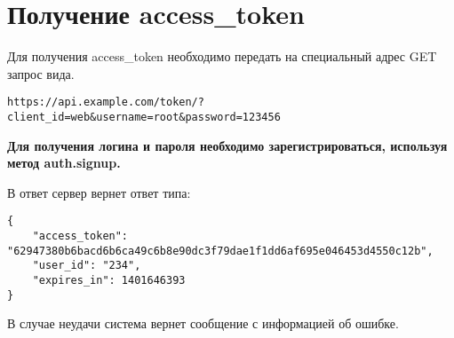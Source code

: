 \section{Получение access\_token}
\par
Для получения access\_token необходимо передать на специальный адрес GET запрос вида. \\


\begin{Verbatim}[frame=single]
https://api.example.com/token/?client_id=web&username=root&password=123456
\end{Verbatim}

\textbf{Для получения логина и пароля необходимо зарегистрироваться, используя метод auth.signup.}

В ответ сервер вернет ответ типа:
\begin{Verbatim}[frame=single]
{
    "access_token": "62947380b6bacd6b6ca49c6b8e90dc3f79dae1f1dd6af695e046453d4550c12b",
    "user_id": "234",
    "expires_in": 1401646393
}
\end{Verbatim}

В случае неудачи система вернет сообщение с информацией об ошибке.
